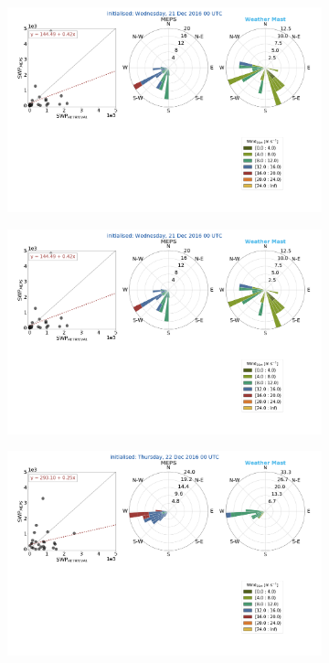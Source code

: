 \begin{figure}[h]
	\begin{subfigure}[b]{0.84\textwidth}
		\includegraphics[trim={2.3cm 19.5cm 2.cm .7cm},clip,width=\textwidth]{./fig_windrose/20161221}
		\caption{}\label{fig:wind21}
	\end{subfigure}
	\begin{subfigure}[b]{0.15\textwidth}
		\includegraphics[trim={50.cm 0.cm 8.3cm 28.4cm},clip,width=\textwidth]{./fig_windrose/20161221}
	\end{subfigure}
	\newline
	\begin{subfigure}[b]{0.84\textwidth}
		\includegraphics[trim={2.3cm 19.5cm 2.cm .7cm},clip,width=\textwidth]{./fig_windrose/20161222}

\end{subfigure}
\end{figure}
